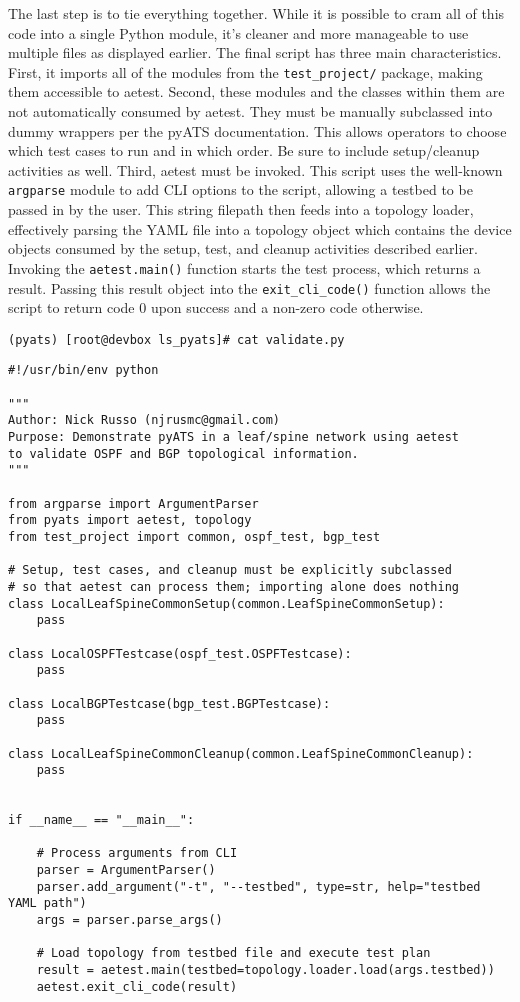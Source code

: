 The last step is to tie everything together. While it is possible to cram all
of this code into a single Python module, it's cleaner and more manageable to
use multiple files as displayed earlier. The final script has three main
characteristics. First, it imports all of the modules from the
\verb|test_project/| package, making them accessible to aetest. Second,
these modules and the classes within them are not automatically consumed by
aetest. They must be manually subclassed into dummy wrappers per the pyATS
documentation. This allows operators to choose which test cases to run and in
which order. Be sure to include setup/cleanup activities as well. Third, aetest
must be invoked. This script uses the well-known \verb|argparse| module to
add CLI options to the script, allowing a testbed to be passed in by the user.
This string filepath then feeds into a topology loader, effectively parsing the
YAML file into a topology object which contains the device objects consumed
by the setup, test, and cleanup activities described earlier. Invoking the
\verb|aetest.main()| function starts the test process, which returns a result.
Passing this result object into the \verb|exit_cli_code()| function allows
the script to return code 0 upon success and a non-zero code otherwise.

\begin{verbatim}
(pyats) [root@devbox ls_pyats]# cat validate.py
\end{verbatim}

\begin{verbatim}
#!/usr/bin/env python

"""
Author: Nick Russo (njrusmc@gmail.com)
Purpose: Demonstrate pyATS in a leaf/spine network using aetest
to validate OSPF and BGP topological information.
"""

from argparse import ArgumentParser
from pyats import aetest, topology
from test_project import common, ospf_test, bgp_test

# Setup, test cases, and cleanup must be explicitly subclassed
# so that aetest can process them; importing alone does nothing
class LocalLeafSpineCommonSetup(common.LeafSpineCommonSetup):
    pass

class LocalOSPFTestcase(ospf_test.OSPFTestcase):
    pass

class LocalBGPTestcase(bgp_test.BGPTestcase):
    pass

class LocalLeafSpineCommonCleanup(common.LeafSpineCommonCleanup):
    pass


if __name__ == "__main__":

    # Process arguments from CLI
    parser = ArgumentParser()
    parser.add_argument("-t", "--testbed", type=str, help="testbed YAML path")
    args = parser.parse_args()

    # Load topology from testbed file and execute test plan
    result = aetest.main(testbed=topology.loader.load(args.testbed))
    aetest.exit_cli_code(result)
\end{verbatim}

